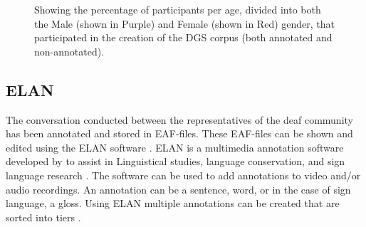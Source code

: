 \begin{figure}[h]
\caption{Showing the percentage of participants per age, divided into both the Male (shown in Purple) and Female (shown in Red) gender,  that participated in the creation of the DGS corpus (both annotated and non-annotated).  \cite{age_data_hamburg}}

\label{fig:bundeslander}
\end{figure}

\subsection{ELAN}
The conversation conducted between the representatives of the deaf community has been annotated and stored in EAF-files. These EAF-files can be shown and edited using the ELAN software \cite{crasborn2008enhanced}. ELAN is a multimedia annotation software developed by \citep{elan_software} to assist in Linguistical studies, language conservation, and sign language research \cite{brugman2004annotating}. The software can be used to add annotations to video and/or audio recordings. An annotation can be a sentence, word, or in the case of sign language, a gloss. Using ELAN multiple annotations can be created that are sorted into tiers \cite{crasborn2008enhanced}.  

